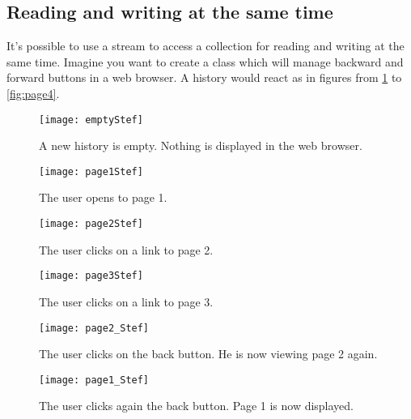 \documentclass[a4paper,10pt,twoside]{book}
\begin{document}
\subsection{Reading and writing at the same time}

It's possible to use a stream to access a collection for reading and writing at the same time.
Imagine you want to create a  class which will manage backward and forward buttons in a web browser.
A history would react as in figures from \ref{fig:emptyStream} to \ref{fig:page4}.

\begin{figure}[!ht]
\centerline{\texttt{[image: emptyStef]}}
\caption{A new history is empty. Nothing is displayed in the web browser.}
\label{fig:emptyStream}
\vspace{.2in}
\end{figure}

\begin{figure}[!ht]
\centerline{\texttt{[image: page1Stef]}}
\caption{The user opens to page 1.}
\label{fig:page1}
\vspace{.2in}
\end{figure}

\begin{figure}[!ht]
\centerline{\texttt{[image: page2Stef]}}
\caption{The user clicks on a link to page 2.}
\label{fig:page2}
\vspace{.2in}
\end{figure}

\begin{figure}[!ht]
\centerline{\texttt{[image: page3Stef]}}
\caption{The user clicks on a link to page 3.}
\label{fig:page3}
\vspace{.2in}
\end{figure}

\begin{figure}[!ht]
\centerline{\texttt{[image: page2\_Stef]}}
\caption{The user clicks on the back button. He is now viewing page 2 again.}
\label{fig:page2_}
\vspace{.2in}
\end{figure}

\begin{figure}[!ht]
\centerline{\texttt{[image: page1\_Stef]}}
\caption{The user clicks again the back button. Page 1 is now displayed.}
\label{fig:page1_}
\vspace{.2in}
\end{figure}
\end{document}
